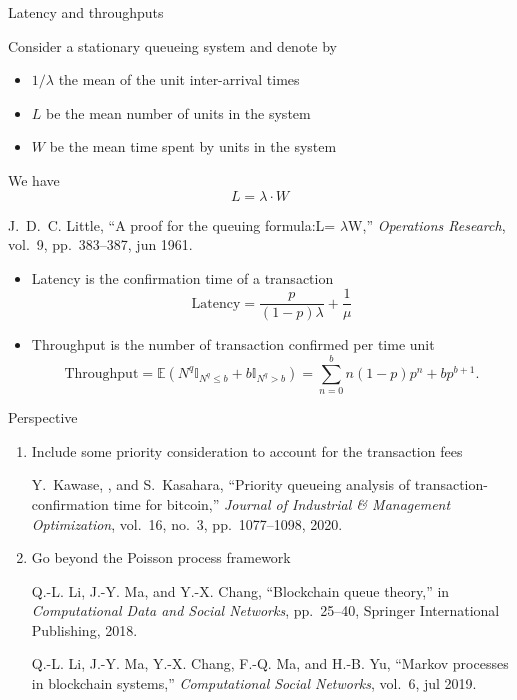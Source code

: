 \documentclass{beamer}
\begin{document}
\begin{frame}{Latency and throughputs}
\scriptsize
\begin{tcolorbox}[enhanced,drop shadow, title=Little's law]
Consider a stationary queueing system and denote by 
\begin{itemize}
  \item $1/\lambda$ the mean of the unit inter-arrival times
  \item $L$ be the mean number of units in the system
  \item $W$ be the mean time spent by units in the system
\end{itemize}
We have
$$
L = \lambda \cdot W
$$
\end{tcolorbox}
\tiny
\begin{thebibliography}{1}

J.~D.~C. Little, ``A proof for the queuing formula:{L}= $\lambda${W},'' {\em
  Operations Research}, vol.~9, pp.~383--387, jun 1961.

\end{thebibliography}
\scriptsize
\begin{itemize}
  \item Latency is the confirmation time of a transaction 
    $$
    \text{Latency} = \frac{p}{(1-p)\lambda} + \frac{1}{\mu}
    $$
  \item Throughput is the number of transaction confirmed per time unit
  $$
    \text{Throughput} = \mathbb{E}(N^q\mathbb{I}_{N^q\leq b}+b\mathbb{I}_{N^q> b}) = \sum_{n = 0}^bn(1-p)p^n + bp^{b+1}.
  $$
\end{itemize}
\end{frame}
\begin{frame}{Perspective}
\begin{enumerate}
  \item  Include some priority consideration to account for the transaction fees 
  \tiny 
  \begin{thebibliography}{1}

Y.~Kawase, , and S.~Kasahara, ``Priority queueing analysis of
  transaction-confirmation time for bitcoin,'' {\em Journal of Industrial {\&}
  Management Optimization}, vol.~16, no.~3, pp.~1077--1098, 2020.

\end{thebibliography}

  \item \normalsize Go beyond the Poisson process framework
  \tiny
  \begin{thebibliography}{1}

Q.-L. Li, J.-Y. Ma, and Y.-X. Chang, ``Blockchain queue theory,'' in {\em
  Computational Data and Social Networks}, pp.~25--40, Springer International
  Publishing, 2018.

Q.-L. Li, J.-Y. Ma, Y.-X. Chang, F.-Q. Ma, and H.-B. Yu, ``Markov processes in
  blockchain systems,'' {\em Computational Social Networks}, vol.~6, jul 2019.

\end{thebibliography}
\end{enumerate}

\end{frame}
\end{document}
